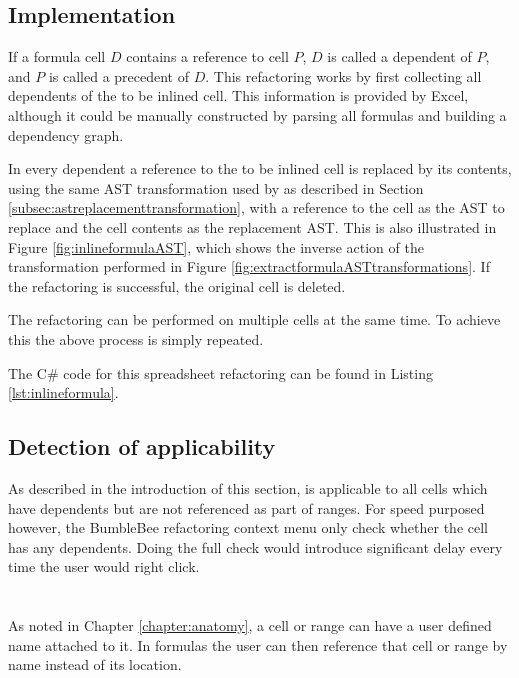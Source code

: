 \subsection{Implementation}
\label{subsec:inlineformulaimplementation}

If a formula cell $D$ contains a reference to cell $P$, $D$ is called a dependent of $P$, and $P$ is called a precedent of $D$.
This refactoring works by first collecting all dependents of the to be inlined cell.
This information is provided by Excel, although it could be manually constructed by parsing all formulas and building a dependency graph.

In every dependent a reference to the to be inlined cell is replaced by its contents, using the same AST transformation used by  as described in Section \ref{subsec:astreplacementtransformation}, with a reference to the cell as the AST to replace and the cell contents as the replacement AST.
This is also illustrated in Figure \ref{fig:inlineformulaAST}, which shows the  inverse action of the transformation performed in Figure \ref{fig:extractformulaASTtransformations}.
If the refactoring is successful, the original cell is deleted.

The refactoring can be performed on multiple cells at the same time.
To achieve this the above process is simply repeated.

The C\# code for this spreadsheet refactoring can be found in Listing \ref{lst:inlineformula}.

\subsection{Detection of applicability}

As described in the introduction of this section,  is applicable to all cells which have dependents but are not referenced as part of ranges.
For speed purposed however, the BumbleBee refactoring context menu only check whether the cell has any dependents.
Doing the full check would introduce significant delay every time the user would right click.

\section{}
\label{refac:introducecellname}

As noted in Chapter \ref{chapter:anatomy}, a cell or range can have a user defined name attached to it.
In formulas the user can then reference that cell or range by name instead of its location.

